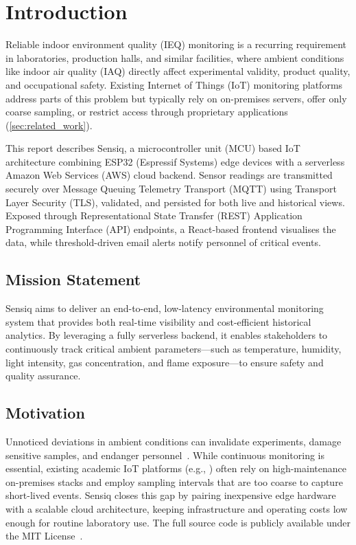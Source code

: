 \section{Introduction}\label{sec:introduction}

Reliable indoor environment quality (IEQ) monitoring is a recurring requirement in
laboratories, production halls, and similar facilities, where ambient
conditions like indoor air quality (IAQ) directly affect experimental
validity, product quality, and occupational safety.
Existing Internet of Things (IoT) monitoring platforms address parts of this problem
but typically rely on on-premises servers, offer only coarse sampling,
or restrict access through proprietary applications (\cref{sec:related_work}).

This report describes Sensiq, a microcontroller unit (MCU) based IoT architecture
combining ESP32 (Espressif Systems) edge devices with a serverless Amazon Web Services (AWS)
cloud backend. Sensor readings are transmitted securely over Message Queuing Telemetry
Transport (MQTT) using Transport Layer Security (TLS), validated, and persisted for both live and
historical views. Exposed through Representational State Transfer (REST) Application
Programming Interface (API) endpoints, a React-based frontend visualises the data,
while threshold-driven email alerts notify personnel of critical events.

\subsection{Mission Statement}\label{sec:mission_statement}
Sensiq aims to deliver an end-to-end, low-latency environmental monitoring system that provides both
real-time visibility and cost-efficient historical analytics. By leveraging a fully
serverless backend, it enables stakeholders to continuously track critical ambient
parameters---such as temperature, humidity, light intensity, gas concentration, and flame exposure---to
ensure safety and quality assurance.

\subsection{Motivation}\label{sec:motivation}
Unnoticed deviations in ambient conditions can invalidate experiments, damage sensitive samples, and endanger
personnel~\cite{ahlneck1990molecular,kockmann2017safety}. While continuous monitoring is essential,
existing academic IoT platforms (e.g., \cite{mumtaz2021internet,marques2019internet}) often rely on
high-maintenance on-premises stacks and employ sampling intervals that are too coarse to capture short-lived events.
Sensiq closes this gap by pairing inexpensive edge hardware with a scalable cloud architecture, keeping infrastructure
and operating costs low enough for routine laboratory use. The full source code is publicly available under
the MIT License~\cite{sensiq_github}.

